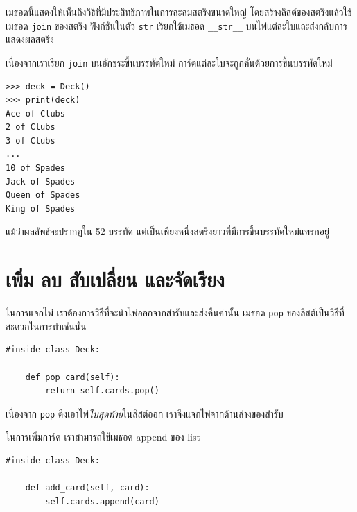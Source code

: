 เมธอดนี้แสดงให้เห็นถึงวิธีที่มีประสิทธิภาพในการสะสมสตริงขนาดใหญ่ โดยสร้างลิสต์ของสตริงแล้วใช้เมธอด {\tt join} ของสตริง 
ฟังก์ชันในตัว {\tt str} เรียกใช้เมธอด \verb"__str__" บนไพ่แต่ละใบและส่งกลับการแสดงผลสตริง 

เนื่องจากเราเรียก {\tt join} บนอักขระขึ้นบรรทัดใหม่ การ์ดแต่ละใบจะถูกคั่นด้วยการขึ้นบรรทัดใหม่

\begin{verbatim}
>>> deck = Deck()
>>> print(deck)
Ace of Clubs
2 of Clubs
3 of Clubs
...
10 of Spades
Jack of Spades
Queen of Spades
King of Spades
\end{verbatim}
%
แม้ว่าผลลัพธ์จะปรากฏใน 52 บรรทัด แต่เป็นเพียงหนึ่งสตริงยาวที่มีการขึ้นบรรทัดใหม่แทรกอยู่

\section{เพิ่ม ลบ สับเปลี่ยน และจัดเรียง} %

ในการแจกไพ่ เราต้องการวิธีที่จะนำไพ่ออกจากสำรับและส่งคืนค่านั้น เมธอด {\tt pop} ของลิสต์เป็นวิธีที่สะดวกในการทำเช่นนั้น

\begin{verbatim}
#inside class Deck:

    def pop_card(self):
        return self.cards.pop()
\end{verbatim}
%
เนื่องจาก {\tt pop} ดึงเอาไพ่{\em ใบสุดท้าย}ในลิสต์ออก เราจึงแจกไพ่จากด้านล่างของสำรับ

ในการเพิ่มการ์ด เราสามารถใช้เมธอด append ของ list

\begin{verbatim}
#inside class Deck:

    def add_card(self, card):
        self.cards.append(card)
\end{verbatim}
%

